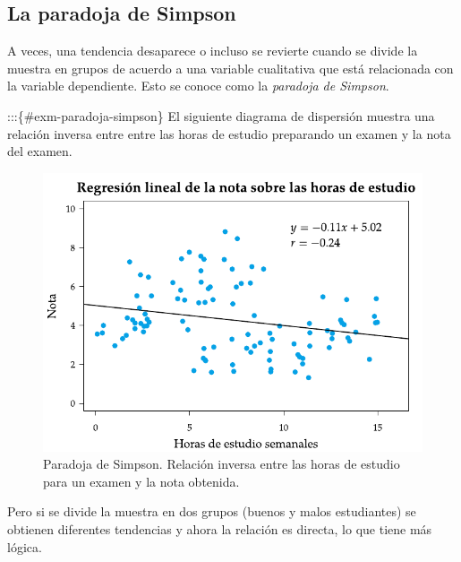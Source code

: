 \documentclass[
  a4paper,
]{scrreport}
\theoremstyle{plain}
\theoremstyle{definition}
\theoremstyle{definition}
\theoremstyle{remark}
\begin{document}
\subsection{La paradoja de Simpson}\label{la-paradoja-de-simpson}

A veces, una tendencia desaparece o incluso se revierte cuando se divide
la muestra en grupos de acuerdo a una variable cualitativa que está
relacionada con la variable dependiente. Esto se conoce como la
\emph{paradoja de Simpson}.

:::\{\#exm-paradoja-simpson\} El siguiente diagrama de dispersión
muestra una relación inversa entre entre las horas de estudio preparando
un examen y la nota del examen.

\begin{figure}[H]

{\centering \includegraphics{img/regresion/paradoja_simpson_1.pdf}

}

\caption{Paradoja de Simpson. Relación inversa entre las horas de
estudio para un examen y la nota obtenida.}

\end{figure}%

Pero si se divide la muestra en dos grupos (buenos y malos estudiantes)
se obtienen diferentes tendencias y ahora la relación es directa, lo que
tiene más lógica.
\end{document}
